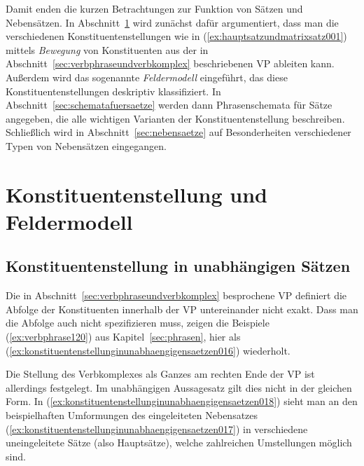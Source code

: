 Damit enden die kurzen Betrachtungen zur Funktion von Sätzen und Nebensätzen.
In Abschnitt~\ref{sec:konstituentenstellungundfeldermodell} wird zunächst dafür argumentiert, dass man die verschiedenen Konstituentenstellungen wie in (\ref{ex:hauptsatzundmatrixsatz001}) mittels \textit{Bewegung} von Konstituenten aus der in Abschnitt~\ref{sec:verbphraseundverbkomplex} beschriebenen VP ableiten kann.
Außerdem wird das sogenannte \textit{Feldermodell} eingeführt, das diese Konstituentenstellungen deskriptiv klassifiziert.
In Abschnitt~\ref{sec:schematafuersaetze} werden dann Phrasenschemata für Sätze angegeben, die alle wichtigen Varianten der Konstituentenstellung beschreiben.
Schließlich wird in Abschnitt~\ref{sec:nebensaetze} auf Besonderheiten verschiedener Typen von Nebensätzen eingegangen.


\section{Konstituentenstellung und Feldermodell}
\label{sec:konstituentenstellungundfeldermodell}

\subsection{Konstituentenstellung in unabhängigen Sätzen}
\label{sec:konstituentenstellunginunabhaengigensaetzen}

Die in Abschnitt~\ref{sec:verbphraseundverbkomplex} besprochene VP definiert die Abfolge der Konstituenten innerhalb der VP untereinander nicht exakt.
Dass man die Abfolge auch nicht spezifizieren muss, zeigen die Beispiele (\ref{ex:verbphrase120}) aus Kapitel~\ref{sec:phrasen}, hier als (\ref{ex:konstituentenstellunginunabhaengigensaetzen016}) wiederholt.

\begin{exe}
  \ex\label{ex:konstituentenstellunginunabhaengigensaetzen016}
  \begin{xlist}
    \ex{\ThePhrasenExOne}
    \ex{\ThePhrasenExTwo}
  \end{xlist}
\end{exe}

Die Stellung des Verbkomplexes als Ganzes am rechten Ende der VP ist allerdings festgelegt.
Im unabhängigen Aussagesatz gilt dies nicht in der gleichen Form.
In (\ref{ex:konstituentenstellunginunabhaengigensaetzen018}) sieht man an den beispielhaften Umformungen des eingeleiteten Nebensatzes (\ref{ex:konstituentenstellunginunabhaengigensaetzen017}) in verschiedene uneingeleitete Sätze (also Hauptsätze), welche zahlreichen Umstellungen möglich sind.


